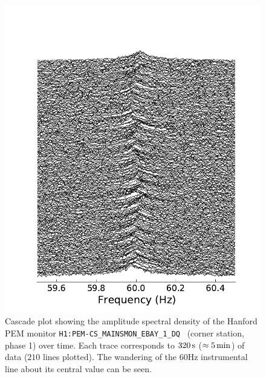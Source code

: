 \documentclass[pra,superscriptaddress,reprint,amsmath,amssymb,nofootinbib]{revtex4-2}
\newcommand{\CSOneName}{\texttt{H1:PEM-CS\_MAINSMON\_EBAY\_1\_DQ}}
\begin{document}
\begin{figure}
	\includegraphics[width=\columnwidth]{images/powerCascade}
	\caption{Cascade plot showing the amplitude spectral density of the Hanford PEM monitor \CSOneName~ (corner station, phase 1) over time. Each trace corresponds to $320\,{\rm s}$ ($\approx 5\,{\rm min}$) of data ($210$ lines plotted). The wandering of the 60Hz instrumental line about its central value can be seen.
	}\label{fig:powerCascade}
\end{figure}




\end{document}
